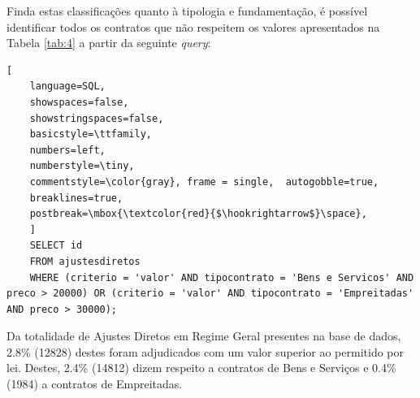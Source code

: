 %	

%	
%	


Finda estas classificações quanto à tipologia e fundamentação, é possível identificar todos os contratos que não respeitem os valores apresentados na Tabela \ref{tab:4} a partir da seguinte \textit{query}: 

\begin{lstlisting}[
	language=SQL,
	showspaces=false,
	showstringspaces=false,
	basicstyle=\ttfamily,
	numbers=left,
	numberstyle=\tiny,
	commentstyle=\color{gray}, frame = single,	autogobble=true,
	breaklines=true,
	postbreak=\mbox{\textcolor{red}{$\hookrightarrow$}\space},
	]
	SELECT id
	FROM ajustesdiretos
	WHERE (criterio = 'valor' AND tipocontrato = 'Bens e Servicos' AND preco > 20000) OR (criterio = 'valor' AND tipocontrato = 'Empreitadas' AND preco > 30000);
\end{lstlisting}

Da totalidade de Ajustes Diretos em Regime Geral presentes na base de dados, 2.8\% (12828) destes foram adjudicados com um valor superior ao permitido por lei. Destes, 2.4\% (14812) dizem respeito a contratos de Bens e Serviços e 0.4\% (1984) a contratos de Empreitadas.


